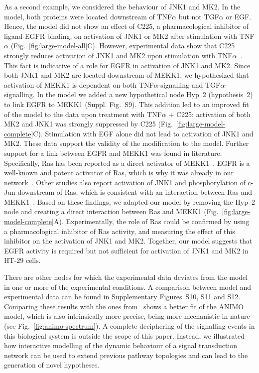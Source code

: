 \documentclass{bmcart}
\begin{document}
As a second example, we considered the behaviour of JNK1 and MK2. In the model, both
proteins were located downstream of TNF$\alpha$ but not TGF$\alpha$ or EGF. Hence, the
model did not show an effect of C225, a pharmacological inhibitor of ligand-EGFR
binding, on activation of JNK1 or MK2 after stimulation with TNF$\alpha$ (Fig.~\ref{fig:large-model-all}C). However, experimental
data show that C225 strongly reduces activation of JNK1 and MK2 upon stimulation with
TNF$\alpha$~\cite{pathway-autocrine}.
This fact is indicative of a role for EGFR in activation of JNK1 and MK2. Since both JNK1 and MK2
are located downstream of MEKK1, we hypothesized that activation
of MEKK1 is dependent on
both TNF$\alpha$-signalling and TGF$\alpha$-signalling. In the model we added a new
hypothetical node {\sf Hyp~2} (hypothesis~2) to link EGFR to MEKK1 (Suppl. Fig.~S9). %
This addition led to an improved fit of the model to the data upon treatment with TNF$\alpha$ + C225:
activation of both MK2 and JNK1 was strongly suppressed by C225 (Fig.~\ref{fig:large-model-complete}C).
Stimulation with EGF alone did not lead to activation of JNK1 and MK2.
These data support the validity of the modification to the model.
Further support for a link between EGFR and MEKK1 was found in literature. Specifically,
Ras has been reported as a direct activator of
MEKK1~\cite{ras-mekk1}. EGFR is a well-known and potent activator of Ras,
which is why it was already in our network~\cite{kegg}.
Other studies also report activation of JNK1 and phosphorylation of c-Jun downstream of Ras, which is consistent with
an interaction between Ras and MEKK1~\cite{cfos-cjun,ras-jnk1}.
Based on these findings, we adapted
our model by removing the {\sf Hyp~2} node and creating a direct interaction between Ras
and MEKK1 (Fig.~\ref{fig:large-model-complete}A). Experimentally, the role of Ras could be confirmed by using a
pharmacological inhibitor of Ras activity, and measuring the effect of this inhibitor on the activation of JNK1 and MK2.
Together, our model suggests that EGFR activity is required
but not sufficient for activation of JNK1 and MK2 in HT-29 cells.


There are other nodes for which the experimental data deviates from the model in one or more of the experimental conditions.
A comparison between model and experimental data can be found in Supplementary Figures~S10, S11 and S12. %
Comparing these results with the ones from~\cite{pathway-fuzzy} shows a better fit of the ANIMO model, which is also intrinsically
more precise, being more mechanistic in nature (see Fig.~\ref{fig:animo-spectrum}).
A complete deciphering of the signalling events
in this biological system is outside the scope of this paper. Instead, we illustrated how interactive modelling of the dynamic behaviour
of a signal transduction network can be used to extend previous pathway topologies and can lead to the generation of novel hypotheses.
\end{document}
